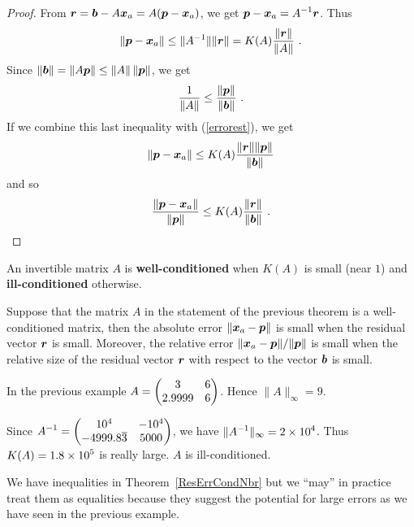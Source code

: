 \begin{proof}
From $\bm{r} = \bm{b} - A\bm{x}_a = A(\bm{p} - \bm{x}_a)$, we get
$\displaystyle \bm{p} - \bm{x}_a = A^{-1}\bm{r}$.  Thus
\begin{equation}\label{errorest}
\| \bm{p} - \bm{x}_a \| \leq \| A^{-1} \| \|\bm{r}\| =
K(A) \frac{\|\bm{r}\|} {\|A\|} \ .
\end{equation}
Since $\| \bm{b} \| = \|A\bm{p} \| \leq \|A\|\, \|\bm{p}\|$,
we get
\[
\frac{1}{\|A\|} \leq \frac{\|\bm{p}\|}{\|\bm{b}\|} \ .
\]
If we combine this last inequality with (\ref{errorest}), we get
\[
\| \bm{p} - \bm{x}_a \| \leq K(A)
\frac{\|\bm{r}\|\|\bm{p}\|}{\|\bm{b}\|}
\]
and so
\[
\frac{\| \bm{p} - \bm{x}_a \|}{\|\bm{p}\|} \leq K(A)
\frac{\|\bm{r}\|}{\|\bm{b}\|} \ .  \qedhere
\]
\end{proof}

\begin{defn}
An invertible matrix $A$ is
{\bfseries well-conditioned} when $K(A)$
is small (near $1$) and
{\bfseries ill-conditioned} otherwise.
\end{defn}

\begin{rmk}
Suppose that the matrix $A$ in the statement of the previous theorem
is a well-conditioned matrix, then the absolute error
$\| \bm{x}_a - \bm{p}\|$ is small when the residual vector
$\bm{r}$ is small.  Moreover, the relative error
$\| \bm{x}_a - \bm{p} \|/\|\bm{p} \|$ is
small when the relative size of the residual vector $\bm{r}$ with
respect to the vector $\bm{b}$ is small.
\end{rmk}

\begin{egg}
In the previous example
$\displaystyle A = \begin{pmatrix}
3 & 6 \\
2.9999 & 6
\end{pmatrix}$.  Hence $\|A\|_\infty = 9$.

Since
$\displaystyle A^{-1} = \begin{pmatrix}
10^4 & -10^4 \\
-4999.8\overline{3} & 5000
\end{pmatrix}$, we have
$\displaystyle \| A^{-1}\|_\infty = 2\times 10^4$.
Thus $\displaystyle K(A) = 1.8\times 10^5$ is really large.  $A$ is
ill-conditioned.

We have inequalities in Theorem~\ref{ResErrCondNbr} but we ``may'' in
practice treat them as equalities because they suggest the
potential for large errors as we have seen in the previous example.
\end{egg}

